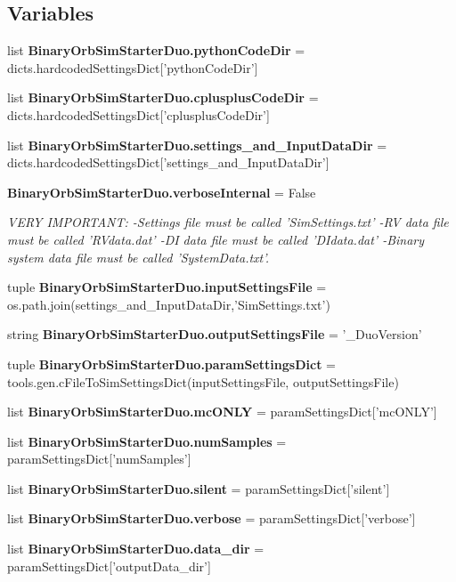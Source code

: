 \subsection*{Variables}
\begin{DoxyCompactItemize}
\item 
list {\bf Binary\-Orb\-Sim\-Starter\-Duo.\-python\-Code\-Dir} = dicts.\-hardcoded\-Settings\-Dict['python\-Code\-Dir']
\item 
list {\bf Binary\-Orb\-Sim\-Starter\-Duo.\-cplusplus\-Code\-Dir} = dicts.\-hardcoded\-Settings\-Dict['cplusplus\-Code\-Dir']
\item 
list {\bf Binary\-Orb\-Sim\-Starter\-Duo.\-settings\-\_\-and\-\_\-\-Input\-Data\-Dir} = dicts.\-hardcoded\-Settings\-Dict['settings\-\_\-and\-\_\-\-Input\-Data\-Dir']
\item 
{\bf Binary\-Orb\-Sim\-Starter\-Duo.\-verbose\-Internal} = False
\begin{DoxyCompactList}\small\item\em V\-E\-R\-Y I\-M\-P\-O\-R\-T\-A\-N\-T\-: -\/\-Settings file must be called 'Sim\-Settings.\-txt' -\/\-R\-V data file must be called 'R\-Vdata.\-dat' -\/\-D\-I data file must be called 'D\-Idata.\-dat' -\/\-Binary system data file must be called 'System\-Data.\-txt'. \end{DoxyCompactList}\item 
tuple {\bf Binary\-Orb\-Sim\-Starter\-Duo.\-input\-Settings\-File} = os.\-path.\-join(settings\-\_\-and\-\_\-\-Input\-Data\-Dir,'Sim\-Settings.\-txt')
\item 
string {\bf Binary\-Orb\-Sim\-Starter\-Duo.\-output\-Settings\-File} = '\-\_\-\-Duo\-Version'
\item 
tuple {\bf Binary\-Orb\-Sim\-Starter\-Duo.\-param\-Settings\-Dict} = tools.\-gen.\-c\-File\-To\-Sim\-Settings\-Dict(input\-Settings\-File, output\-Settings\-File)
\item 
list {\bf Binary\-Orb\-Sim\-Starter\-Duo.\-mc\-O\-N\-L\-Y} = param\-Settings\-Dict['mc\-O\-N\-L\-Y']
\item 
list {\bf Binary\-Orb\-Sim\-Starter\-Duo.\-num\-Samples} = param\-Settings\-Dict['num\-Samples']
\item 
list {\bf Binary\-Orb\-Sim\-Starter\-Duo.\-silent} = param\-Settings\-Dict['silent']
\item 
list {\bf Binary\-Orb\-Sim\-Starter\-Duo.\-verbose} = param\-Settings\-Dict['verbose']
\item 
list {\bf Binary\-Orb\-Sim\-Starter\-Duo.\-data\-\_\-dir} = param\-Settings\-Dict['output\-Data\-\_\-dir']

\end{DoxyCompactItemize}
